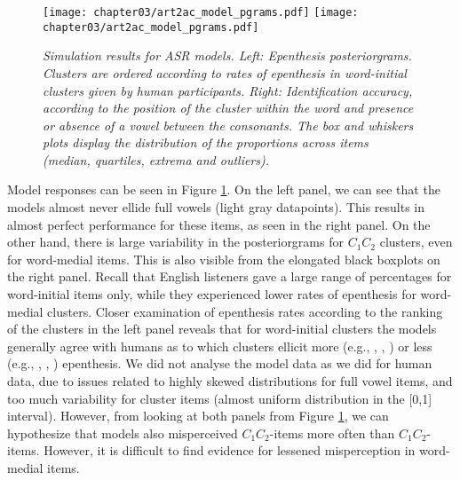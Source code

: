 {%
\begin{figure}[htb!]
    \centering
    \texttt{[image: chapter03/art2ac\_model\_pgrams.pdf]}%
    \hspace{0.5cm}
    \texttt{[image: chapter03/art2ac\_model\_pgrams.pdf]}

    \caption{\textit{Simulation results for ASR models.
      Left: Epenthesis posteriorgrams. Clusters are ordered according to rates of epenthesis in word-initial clusters given by human participants. 
      Right: Identification accuracy, according to the position of the cluster within the word and presence or absence of a vowel between the consonants. The box and whiskers plots display the distribution of the proportions across items (median, quartiles, extrema and outliers).}}
    \label{fig:wpd-mod}
  \end{figure}

  Model responses can be seen in Figure \ref{fig:wpd-mod}. On the left panel, we can see that the models almost never ellide full vowels (light gray datapoints). This results in almost perfect performance for these items, as seen in the right panel.
  On the other hand, there is large variability in the posteriorgrams for $C_{1}C_{2}$ clusters, even for word-medial items. This is also visible from the elongated black boxplots on the right panel. Recall that English listeners gave a large range of percentages for word-initial items only, while they experienced lower rates of epenthesis for word-medial clusters.
  Closer examination of epenthesis rates according to the ranking of the clusters in the left panel reveals that for word-initial clusters the models generally agree with humans as to which clusters ellicit more (e.g., , , ) or less (e.g., , , ) epenthesis.
  We did not analyse the model data as we did for human data, due to issues related to highly skewed distributions for full vowel items, and too much variability for cluster items (almost uniform distribution in the [0,1] interval). However, from looking at both panels from Figure \ref{fig:wpd-mod}, we can hypothesize that models also misperceived $C_{1}C_{2}$-items more often than $C_{1}$\textipa{[@]}$C_{2}$-items. However, it is difficult to find evidence for lessened misperception in word-medial items.  
  
}
